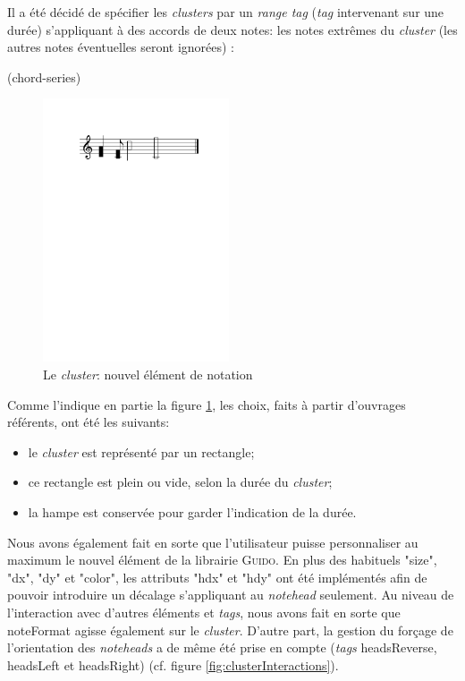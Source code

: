 \documentclass{article}
\newenvironment{gmncode}	{\vspace{-2mm}\small\verbatim}{\endverbatim\vspace{-2mm}}
\newcommand{\guido}			{\textsc{Guido}}
\begin{document}
Il a été décidé de spécifier les \emph{clusters} par un \emph{range tag} (\emph{tag} intervenant sur une durée) s'appliquant à des accords de deux notes: les notes extrêmes du \emph{cluster} (les autres notes éventuelles seront ignorées) :

\begin{gmncode}
(chord-series)
\end{gmncode}


%
\begin{figure}[h]
\centering
\begin{gmncode}
[
  \cluster({a, d} {c/8, f}
    {a/2, d2} {f/1, c1})
]
\end{gmncode}
\includegraphics[width=55mm]{img/partitions/cluster.pdf}
\caption{Le \emph{cluster}: nouvel élément de notation}
\label{fig:cluster}
\end{figure}
%

Comme l'indique en partie la figure \ref{fig:cluster}, les choix, faits à partir d'ouvrages référents, ont été les suivants:
\begin{itemize}
	\item le \emph{cluster} est représenté par un rectangle;
	\item ce rectangle est plein ou vide, selon la durée du \emph{cluster};
	\item la hampe est conservée pour garder l'indication de la durée.
\end{itemize}

Nous avons également fait en sorte que l'utilisateur puisse personnaliser au maximum le nouvel élément de la librairie \guido. En plus des habituels "size", "dx", "dy" et "color", les attributs "hdx" et "hdy" ont été implémentés afin de pouvoir introduire un décalage s'appliquant au \emph{notehead} seulement. Au niveau de l'interaction avec d'autres éléments et \emph{tags}, nous avons fait en sorte que noteFormat agisse également sur le \emph{cluster}. D'autre part, la gestion du forçage de l'orientation des \emph{noteheads} a de même été prise en compte (\emph{tags} headsReverse, headsLeft et headsRight) (cf. figure \ref{fig:clusterInteractions}).
\end{document}
